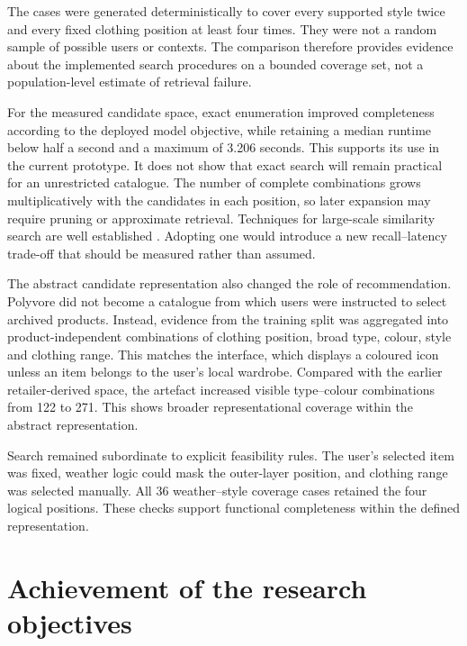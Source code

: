 The cases were generated deterministically to cover every supported style
twice and every fixed clothing position at least four times. They were not a
random sample of possible users or contexts. The comparison therefore provides
evidence about the implemented search procedures on a bounded coverage set,
not a population-level estimate of retrieval failure.

For the measured candidate space, exact enumeration improved
completeness according to the deployed model objective, while retaining a
median runtime below half a second and a maximum of 3.206 seconds. This supports
its use in the current prototype. It does not show that exact search will
remain practical for an unrestricted catalogue. The number of complete
combinations grows multiplicatively with the candidates in each position, so
later expansion may require pruning or approximate retrieval. Techniques for
large-scale similarity search are well established \parencite{johnson2021similarity}.
Adopting one would introduce a new recall--latency trade-off that should be
measured rather than assumed.

The abstract candidate representation also changed the role of recommendation.
Polyvore did not become a catalogue from which users were instructed to select
archived products. Instead, evidence from the training split was aggregated
into product-independent combinations of clothing position, broad type,
colour, style and clothing range. This matches the interface, which displays a
coloured icon unless an item belongs to the user's local wardrobe. Compared
with the earlier retailer-derived space, the artefact increased visible
type--colour combinations from 122 to 271. This shows broader representational
coverage within the abstract representation.

Search remained subordinate to explicit feasibility rules. The user's
selected item was fixed, weather logic could mask the outer-layer position,
and clothing range was selected manually. All 36 weather--style coverage cases
retained the four logical positions. These checks support functional
completeness within the defined representation.

\section{Achievement of the research objectives}

